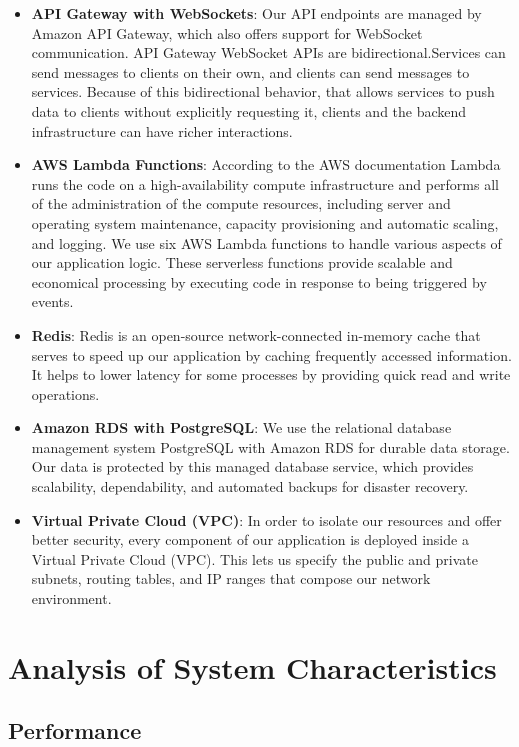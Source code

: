 \documentclass{article}
\begin{document}
\begin{itemize}
    \item \textbf{API Gateway with WebSockets}: Our API endpoints are managed by Amazon API Gateway, which also offers support for WebSocket communication. API Gateway WebSocket APIs are bidirectional.Services can send messages to clients on their own, and clients can send messages to services. Because of this bidirectional behavior, that allows services to push data to clients without explicitly requesting it, clients and the backend infrastructure can have richer interactions. 
    \item \textbf{AWS Lambda Functions}: According to the AWS documentation Lambda runs the code on a high-availability compute infrastructure and performs all of the administration of the compute resources, including server and operating system maintenance, capacity provisioning and automatic scaling, and logging. We use six AWS Lambda functions to handle various aspects of our application logic. These serverless functions provide scalable and economical processing by executing code in response to being triggered by events.
    \item \textbf{Redis}: Redis is an open-source network-connected in-memory cache that serves to speed up our application by caching frequently accessed information. It helps to lower latency for some processes by providing quick read and write operations.
    \item \textbf{Amazon RDS with PostgreSQL}: We use the relational database management system PostgreSQL with Amazon RDS for durable data storage. Our data is protected by this managed database service, which provides scalability, dependability, and automated backups for disaster recovery.
    \item \textbf{Virtual Private Cloud (VPC)}: In order to isolate our resources and offer better security, every component of our application is deployed inside a Virtual Private Cloud (VPC). This lets us specify the public and private subnets, routing tables, and IP ranges that compose our network environment.
\end{itemize}

\section{Analysis of System Characteristics}


\subsection{Performance}
\end{document}
